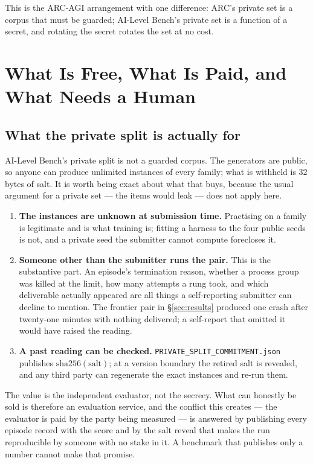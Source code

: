 This is the ARC-AGI arrangement \citep{arc2026} with one difference: ARC's private set is a corpus that must be guarded; AI-Level Bench's private set is a function of a secret, and rotating the secret rotates the set at no cost.

\section{What Is Free, What Is Paid, and What Needs a Human}\label{sec:governance}

\subsection{What the private split is actually for}

AI-Level Bench's private split is not a guarded corpus. The generators are public, so anyone can produce unlimited instances of every family; what is withheld is 32 bytes of salt. It is worth being exact about what that buys, because the usual argument for a private set --- the items would leak --- does not apply here.

\begin{enumerate}[leftmargin=*,itemsep=2pt]
\item \textbf{The instances are unknown at submission time.} Practising on a family is legitimate and is what training is; fitting a harness to the four public seeds is not, and a private seed the submitter cannot compute forecloses it.
\item \textbf{Someone other than the submitter runs the pair.} This is the substantive part. An episode's termination reason, whether a process group was killed at the limit, how many attempts a rung took, and which deliverable actually appeared are all things a self-reporting submitter can decline to mention. The frontier pair in \S\ref{sec:results} produced one crash after twenty-one minutes with nothing delivered; a self-report that omitted it would have raised the reading.
\item \textbf{A past reading can be checked.} \texttt{PRIVATE\_SPLIT\_COMMITMENT.json} publishes $\text{sha256}(\text{salt})$; at a version boundary the retired salt is revealed, and any third party can regenerate the exact instances and re-run them.
\end{enumerate}

The value is the independent evaluator, not the secrecy. What can honestly be sold is therefore an evaluation service, and the conflict this creates --- the evaluator is paid by the party being measured --- is answered by publishing every episode record with the score and by the salt reveal that makes the run reproducible by someone with no stake in it. A benchmark that publishes only a number cannot make that promise.

